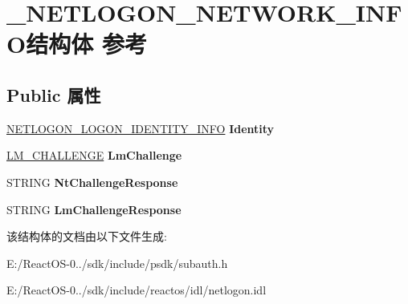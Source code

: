 \hypertarget{struct___n_e_t_l_o_g_o_n___n_e_t_w_o_r_k___i_n_f_o}{}\section{\+\_\+\+N\+E\+T\+L\+O\+G\+O\+N\+\_\+\+N\+E\+T\+W\+O\+R\+K\+\_\+\+I\+N\+F\+O结构体 参考}
\label{struct___n_e_t_l_o_g_o_n___n_e_t_w_o_r_k___i_n_f_o}
\subsection*{Public 属性}
\begin{DoxyCompactItemize}
\item 
\mbox{\label{struct___n_e_t_l_o_g_o_n___n_e_t_w_o_r_k___i_n_f_o_adcd4a61b6588ec39dad601a8bb3d0682}} 
\hyperlink{struct___n_e_t_l_o_g_o_n___l_o_g_o_n___i_d_e_n_t_i_t_y___i_n_f_o}{N\+E\+T\+L\+O\+G\+O\+N\+\_\+\+L\+O\+G\+O\+N\+\_\+\+I\+D\+E\+N\+T\+I\+T\+Y\+\_\+\+I\+N\+FO} {\bfseries Identity}
\item 
\mbox{\label{struct___n_e_t_l_o_g_o_n___n_e_t_w_o_r_k___i_n_f_o_a21b971b9679cb3082d210f3b7089ce03}} 
\hyperlink{struct_l_m___c_h_a_l_l_e_n_g_e}{L\+M\+\_\+\+C\+H\+A\+L\+L\+E\+N\+GE} {\bfseries Lm\+Challenge}
\item 
\mbox{\label{struct___n_e_t_l_o_g_o_n___n_e_t_w_o_r_k___i_n_f_o_a8235b8dd44a39781ef788fc751ab9ce3}} 
S\+T\+R\+I\+NG {\bfseries Nt\+Challenge\+Response}
\item 
\mbox{\label{struct___n_e_t_l_o_g_o_n___n_e_t_w_o_r_k___i_n_f_o_ac923a4637a8d0be25a24fbe9a7d1492e}} 
S\+T\+R\+I\+NG {\bfseries Lm\+Challenge\+Response}
\end{DoxyCompactItemize}


该结构体的文档由以下文件生成\+:\begin{DoxyCompactItemize}
\item 
E\+:/\+React\+O\+S-\/0../sdk/include/psdk/subauth.\+h\item 
E\+:/\+React\+O\+S-\/0../sdk/include/reactos/idl/netlogon.\+idl\end{DoxyCompactItemize}
